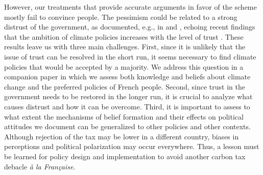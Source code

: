 \documentclass[12pt]{article} %
\begin{document}
However, our treatments that provide accurate arguments in favor of the scheme mostly fail to convince people. The pessimism could be related to a strong distrust of the government, as documented, e.g., in \citet{alesina_intergenerational_2018} and \citet{algan_et_al_19}, echoing recent findings that the ambition of climate policies increases with the level of trust \citep{rafaty_perceptions_2018}. These results leave us with three main challenges. First, since it is unlikely that the issue of trust can be resolved in the short run, it seems necessary to find climate policies that would be accepted by a majority. We address this question in a companion paper \citep{douenne_french_2019} in which we assess both knowledge and beliefs about climate change and the preferred policies of French people. Second, since trust in the government needs to be restored in the longer run, it is crucial to analyze what causes distrust and how it can be overcome. Third, it is important to assess to what extent the mechanisms of belief formation and their effects on political attitudes we document can be generalized to other policies and other contexts. Although rejection of the tax may be lower in a different country, biases in perceptions and political polarization may occur everywhere. Thus, a lesson must be learned for policy design and implementation to avoid another carbon tax debacle \textit{à la Française}.

\newpage
\renewcommand{\url}[1]{\href{#1}{Link}}


\end{document}
